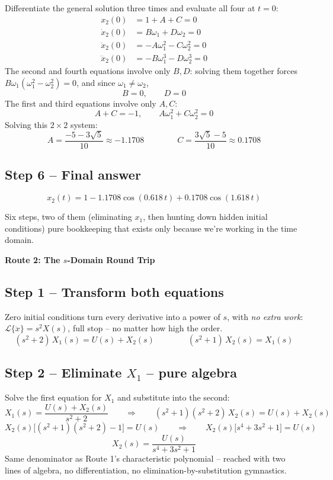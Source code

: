 \documentclass[11pt]{article}
\newcommand{\sdhead}[1]{{\large\bfseries\color{sdcolor} #1}}
\begin{document}
Differentiate the general solution three times and evaluate all four at
$t=0$:
\[
\begin{aligned}
x_2(0) &= 1 + A + C = 0 \\
\dot x_2(0) &= B\omega_1 + D\omega_2 = 0 \\
\ddot x_2(0) &= -A\omega_1^2 - C\omega_2^2 = 0 \\
\dddot x_2(0) &= -B\omega_1^3 - D\omega_2^3 = 0
\end{aligned}
\]
The second and fourth equations involve only $B,D$: solving them together
forces $B\omega_1(\omega_1^2-\omega_2^2)=0$, and since $\omega_1\ne\omega_2$,
\[
B = 0, \qquad D = 0
\]
The first and third equations involve only $A,C$:
\[
A+C=-1, \qquad A\omega_1^2 + C\omega_2^2 = 0
\]
Solving this $2\times 2$ system:
\[
A = \frac{-5-3\sqrt5}{10} \approx -1.1708
\qquad\qquad
C = \frac{3\sqrt5-5}{10} \approx 0.1708
\]

\subsection*{Step 6 -- Final answer}

\begin{tcolorbox}[answerbox]
\[
x_2(t) = 1 - 1.1708\cos(0.618\,t) + 0.1708\cos(1.618\,t)
\]
\end{tcolorbox}

Six steps, two of them (eliminating $x_1$, then hunting down hidden
initial conditions) pure bookkeeping that exists only because we're
working in the time domain.

\newpage
\sdhead{Route 2: The $s$-Domain Round Trip}

\subsection*{Step 1 -- Transform both equations}

Zero initial conditions turn every derivative into a power of $s$, with
\emph{no extra work}: $\mathcal L\{\ddot x\} = s^2 X(s)$, full stop --
no matter how high the order.
\[
(s^2+2)\,X_1(s) = U(s) + X_2(s)
\qquad\qquad
(s^2+1)\,X_2(s) = X_1(s)
\]

\subsection*{Step 2 -- Eliminate $X_1$ -- pure algebra}

Solve the first equation for $X_1$ and substitute into the second:
\[
X_1(s) = \frac{U(s)+X_2(s)}{s^2+2}
\qquad\Longrightarrow\qquad
(s^2+1)(s^2+2)\,X_2(s) = U(s) + X_2(s)
\]
\[
X_2(s)\Big[(s^2+1)(s^2+2) - 1\Big] = U(s)
\qquad\Longrightarrow\qquad
X_2(s)\big[s^4+3s^2+1\big] = U(s)
\]
\[
X_2(s) = \frac{U(s)}{s^4+3s^2+1}
\]
Same denominator as Route 1's characteristic polynomial -- reached with
two lines of algebra, no differentiation, no elimination-by-substitution
gymnastics.
\end{document}
